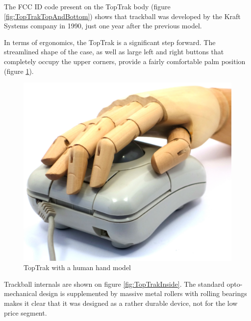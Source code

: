 \documentclass[11pt, a4paper]{article}
\begin{document}
The FCC ID code present on the TopTrak body (figure \ref{fig:TopTrakTopAndBottom}) shows that trackball was developed by the Kraft Systems company in 1990, just one year after the previous model.

In terms of ergonomics, the TopTrak is a significant step forward. The streamlined shape of the case, as well as large left and right buttons that completely occupy the upper corners, provide a fairly comfortable palm position (figure \ref{fig:TopTrakHand}).


\begin{figure}[h]
    \centering
    \includegraphics[scale=0.45]{1990_kraft_toptrack/hand_60.jpg}
    \caption{TopTrak with a human hand model}
    \label{fig:TopTrakHand}
\end{figure}



Trackball internals are shown on figure \ref{fig:TopTrakInside}. The standard opto-mechanical design is supplemented by massive metal rollers with rolling bearings makes it clear that it was designed as a rather durable device, not for the low price segment.
\end{document}
